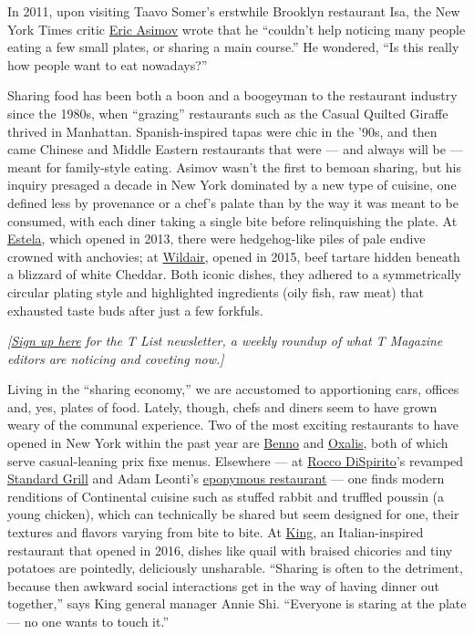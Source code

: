In 2011, upon visiting Taavo Somer's erstwhile Brooklyn restaurant Isa,
the New York Times critic
\href{https://www.nytimes3xbfgragh.onion/by/eric-asimov}{Eric Asimov}
wrote that he ``couldn't help noticing many people eating a few small
plates, or sharing a main course.'' He wondered, ``Is this really how
people want to eat nowadays?''

Sharing food has been both a boon and a boogeyman to the restaurant
industry since the 1980s, when ``grazing'' restaurants such as the
Casual Quilted Giraffe thrived in Manhattan. Spanish-inspired tapas were
chic in the '90s, and then came Chinese and Middle Eastern restaurants
that were --- and always will be --- meant for family-style eating.
Asimov wasn't the first to bemoan sharing, but his inquiry presaged a
decade in New York dominated by a new type of cuisine, one defined less
by provenance or a chef's palate than by the way it was meant to be
consumed, with each diner taking a single bite before relinquishing the
plate. At \href{https://www.estelanyc.com/}{Estela}, which opened in
2013, there were hedgehog-like piles of pale endive crowned with
anchovies; at \href{http://wildair.nyc/}{Wildair}, opened in 2015, beef
tartare hidden beneath a blizzard of white Cheddar. Both iconic dishes,
they adhered to a symmetrically circular plating style and highlighted
ingredients (oily fish, raw meat) that exhausted taste buds after just a
few forkfuls.

\emph{{[}}\href{https://www.nytimes3xbfgragh.onion/newsletters/t-list?module=inline}{\emph{Sign
up here}} \emph{for the T List newsletter, a weekly roundup of what T
Magazine editors are noticing and coveting now.{]}}

Living in the ``sharing economy,'' we are accustomed to apportioning
cars, offices and, yes, plates of food. Lately, though, chefs and diners
seem to have grown weary of the communal experience. Two of the most
exciting restaurants to have opened in New York within the past year are
\href{https://www.bennorestaurant.com/}{Benno} and
\href{https://oxalisnyc.com/}{Oxalis}, both of which serve
casual-leaning prix fixe menus. Elsewhere --- at
\href{https://www.nytimes3xbfgragh.onion/topic/person/rocco-dispirito}{Rocco
DiSpirito}'s revamped \href{http://www.thestandardgrill.com/}{Standard
Grill} and Adam Leonti's \href{http://www.leontinyc.com/}{eponymous
restaurant} --- one finds modern renditions of Continental cuisine such
as stuffed rabbit and truffled poussin (a young chicken), which can
technically be shared but seem designed for one, their textures and
flavors varying from bite to bite. At
\href{http://kingrestaurant.nyc/}{King}, an Italian-inspired restaurant
that opened in 2016, dishes like quail with braised chicories and tiny
potatoes are pointedly, deliciously unsharable. ``Sharing is often to
the detriment, because then awkward social interactions get in the way
of having dinner out together,'' says King general manager Annie Shi.
``Everyone is staring at the plate --- no one wants to touch it.''

